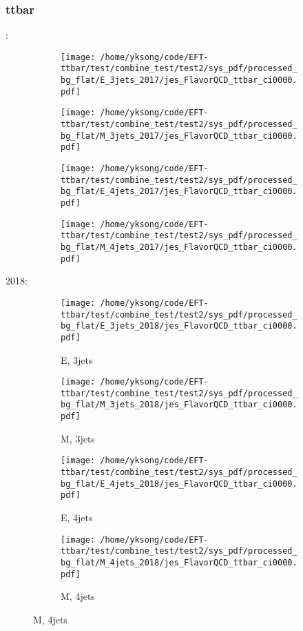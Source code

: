\documentclass{beamer}
\begin{document}
\begin{frame}
\frametitle{ttbar}
\fontsize{5}{1}:
\begin{figure}
\centering
\begin{subfigure}[b]{0.24\textwidth}
\texttt{[image: /home/yksong/code/EFT-ttbar/test/combine\_test/test2/sys\_pdf/processed\_bg\_flat/E\_3jets\_2017/jes\_FlavorQCD\_ttbar\_ci0000.pdf]}
\end{subfigure}
\begin{subfigure}[b]{0.24\textwidth}
\texttt{[image: /home/yksong/code/EFT-ttbar/test/combine\_test/test2/sys\_pdf/processed\_bg\_flat/M\_3jets\_2017/jes\_FlavorQCD\_ttbar\_ci0000.pdf]}
\end{subfigure}
\begin{subfigure}[b]{0.24\textwidth}
\texttt{[image: /home/yksong/code/EFT-ttbar/test/combine\_test/test2/sys\_pdf/processed\_bg\_flat/E\_4jets\_2017/jes\_FlavorQCD\_ttbar\_ci0000.pdf]}
\end{subfigure}
\begin{subfigure}[b]{0.24\textwidth}
\texttt{[image: /home/yksong/code/EFT-ttbar/test/combine\_test/test2/sys\_pdf/processed\_bg\_flat/M\_4jets\_2017/jes\_FlavorQCD\_ttbar\_ci0000.pdf]}
\end{subfigure}
\end{figure}
2018:
\begin{figure}
\centering
\begin{subfigure}[b]{0.24\textwidth}
\texttt{[image: /home/yksong/code/EFT-ttbar/test/combine\_test/test2/sys\_pdf/processed\_bg\_flat/E\_3jets\_2018/jes\_FlavorQCD\_ttbar\_ci0000.pdf]}
\captionsetup{font=tiny}
\caption{E, 3jets}
\end{subfigure}
\begin{subfigure}[b]{0.24\textwidth}
\texttt{[image: /home/yksong/code/EFT-ttbar/test/combine\_test/test2/sys\_pdf/processed\_bg\_flat/M\_3jets\_2018/jes\_FlavorQCD\_ttbar\_ci0000.pdf]}
\captionsetup{font=tiny}
\caption{M, 3jets}
\end{subfigure}
\begin{subfigure}[b]{0.24\textwidth}
\texttt{[image: /home/yksong/code/EFT-ttbar/test/combine\_test/test2/sys\_pdf/processed\_bg\_flat/E\_4jets\_2018/jes\_FlavorQCD\_ttbar\_ci0000.pdf]}
\captionsetup{font=tiny}
\caption{E, 4jets}
\end{subfigure}
\begin{subfigure}[b]{0.24\textwidth}
\texttt{[image: /home/yksong/code/EFT-ttbar/test/combine\_test/test2/sys\_pdf/processed\_bg\_flat/M\_4jets\_2018/jes\_FlavorQCD\_ttbar\_ci0000.pdf]}
\captionsetup{font=tiny}
\caption{M, 4jets}
\end{subfigure}
\end{figure}
\end{frame}
\end{document}
